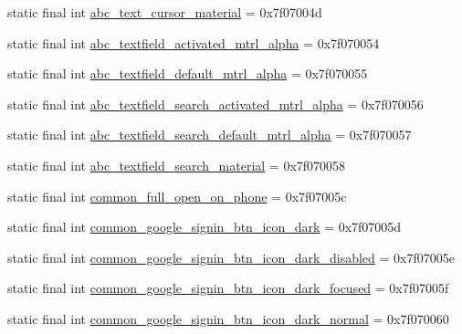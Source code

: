\begin{DoxyCompactItemize}
static final int \mbox{\hyperlink{classcom_1_1google_1_1android_1_1gms_1_1R_1_1drawable_ac1bdbcb819853121a64955244d17a304}{abc\+\_\+text\+\_\+cursor\+\_\+material}} = 0x7f07004d
\item 
static final int \mbox{\hyperlink{classcom_1_1google_1_1android_1_1gms_1_1R_1_1drawable_abc882524f27e51690c93e05adf4f1998}{abc\+\_\+textfield\+\_\+activated\+\_\+mtrl\+\_\+alpha}} = 0x7f070054
\item 
static final int \mbox{\hyperlink{classcom_1_1google_1_1android_1_1gms_1_1R_1_1drawable_a78e22e0498d38c5234a4e35d93a33977}{abc\+\_\+textfield\+\_\+default\+\_\+mtrl\+\_\+alpha}} = 0x7f070055
\item 
static final int \mbox{\hyperlink{classcom_1_1google_1_1android_1_1gms_1_1R_1_1drawable_a6eb5b981c2488dbfc822ff38fa1351e5}{abc\+\_\+textfield\+\_\+search\+\_\+activated\+\_\+mtrl\+\_\+alpha}} = 0x7f070056
\item 
static final int \mbox{\hyperlink{classcom_1_1google_1_1android_1_1gms_1_1R_1_1drawable_aef07b25eb62280cd88fb219e3e51f1bb}{abc\+\_\+textfield\+\_\+search\+\_\+default\+\_\+mtrl\+\_\+alpha}} = 0x7f070057
\item 
static final int \mbox{\hyperlink{classcom_1_1google_1_1android_1_1gms_1_1R_1_1drawable_ace813066dd2006bde717224b76f81b24}{abc\+\_\+textfield\+\_\+search\+\_\+material}} = 0x7f070058
\item 
static final int \mbox{\hyperlink{classcom_1_1google_1_1android_1_1gms_1_1R_1_1drawable_a4f5b0b95f308df3fdbf10fe361a74ac7}{common\+\_\+full\+\_\+open\+\_\+on\+\_\+phone}} = 0x7f07005c
\item 
static final int \mbox{\hyperlink{classcom_1_1google_1_1android_1_1gms_1_1R_1_1drawable_a5eefc1e7bb93699e00375270d6916ef5}{common\+\_\+google\+\_\+signin\+\_\+btn\+\_\+icon\+\_\+dark}} = 0x7f07005d
\item 
static final int \mbox{\hyperlink{classcom_1_1google_1_1android_1_1gms_1_1R_1_1drawable_a3adf354ba12b310a2c6d83f11c19e2ad}{common\+\_\+google\+\_\+signin\+\_\+btn\+\_\+icon\+\_\+dark\+\_\+disabled}} = 0x7f07005e
\item 
static final int \mbox{\hyperlink{classcom_1_1google_1_1android_1_1gms_1_1R_1_1drawable_a9937cdf5796faf170815696f6096e190}{common\+\_\+google\+\_\+signin\+\_\+btn\+\_\+icon\+\_\+dark\+\_\+focused}} = 0x7f07005f
\item 
static final int \mbox{\hyperlink{classcom_1_1google_1_1android_1_1gms_1_1R_1_1drawable_a7bb8c1e03582a240ee0af494f0c00807}{common\+\_\+google\+\_\+signin\+\_\+btn\+\_\+icon\+\_\+dark\+\_\+normal}} = 0x7f070060

\end{DoxyCompactItemize}
